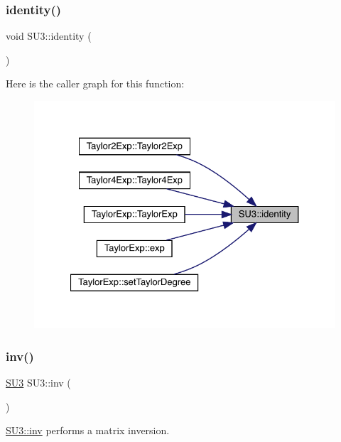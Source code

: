 \subsubsection{\texorpdfstring{identity()}{identity()}}
{\footnotesize\ttfamily void S\+U3\+::identity (\begin{DoxyParamCaption}{ }\end{DoxyParamCaption})}

Here is the caller graph for this function\+:
\nopagebreak
\begin{figure}[H]
\begin{center}
\leavevmode
\includegraphics[width=327pt]{class_s_u3_af84aef1d34a4fdcda292200804eb1221_icgraph}
\end{center}
\end{figure}
\mbox{\label{class_s_u3_ad0e19706d3c6fdb50dcf788d4b48eb4c}} 
\subsubsection{\texorpdfstring{inv()}{inv()}}
{\footnotesize\ttfamily \mbox{\hyperlink{class_s_u3}{S\+U3}} S\+U3\+::inv (\begin{DoxyParamCaption}{ }\end{DoxyParamCaption})\hspace{0.3cm}{\ttfamily [inline]}}



\mbox{\hyperlink{class_s_u3_ad0e19706d3c6fdb50dcf788d4b48eb4c}{S\+U3\+::inv}} performs a matrix inversion. 

